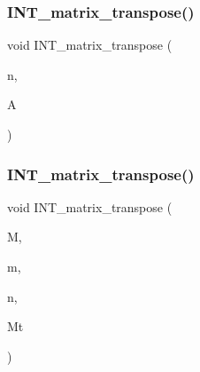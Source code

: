 \subsubsection{\texorpdfstring{I\+N\+T\+\_\+matrix\+\_\+transpose()}{INT\_matrix\_transpose()}\hspace{0.1cm}{\footnotesize\ttfamily [1/2]}}
{\footnotesize\ttfamily void I\+N\+T\+\_\+matrix\+\_\+transpose (\begin{DoxyParamCaption}\item[{\mbox{\hyperlink{galois_8h_a09fddde158a3a20bd2dcadb609de11dc}{I\+NT}}}]{n,  }\item[{\mbox{\hyperlink{galois_8h_a09fddde158a3a20bd2dcadb609de11dc}{I\+NT}} $\ast$}]{A }\end{DoxyParamCaption})}

\mbox{\label{util_8_c_a67c701ffb9ac7556061ad68113b98daf}} 
\subsubsection{\texorpdfstring{I\+N\+T\+\_\+matrix\+\_\+transpose()}{INT\_matrix\_transpose()}\hspace{0.1cm}{\footnotesize\ttfamily [2/2]}}
{\footnotesize\ttfamily void I\+N\+T\+\_\+matrix\+\_\+transpose (\begin{DoxyParamCaption}\item[{\mbox{\hyperlink{galois_8h_a09fddde158a3a20bd2dcadb609de11dc}{I\+NT}} $\ast$}]{M,  }\item[{\mbox{\hyperlink{galois_8h_a09fddde158a3a20bd2dcadb609de11dc}{I\+NT}}}]{m,  }\item[{\mbox{\hyperlink{galois_8h_a09fddde158a3a20bd2dcadb609de11dc}{I\+NT}}}]{n,  }\item[{\mbox{\hyperlink{galois_8h_a09fddde158a3a20bd2dcadb609de11dc}{I\+NT}} $\ast$}]{Mt }\end{DoxyParamCaption})}

\mbox{\label{util_8_c_a57604af509e1d43e918fd38e5f4ee96f}} 
